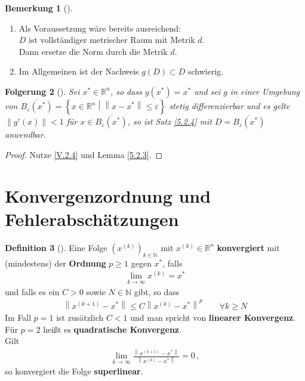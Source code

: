 \documentclass[ngerman,fontsize=11pt, paper=a4, parskip=half, titlepage=true, toc=bib]{scrbook}
\theoremstyle{definition}
\newtheorem{Def}{Definition}[section]		%
\newtheorem{Bem}[Def]{Bemerkung}	%
\theoremstyle{plain}
\newtheorem{Fol}[Def]{Folgerung}
\newcommand{\R}{\mathds{R}}
\newcommand{\N}{\mathds{N}}
\newcommand{\nn}[1]{\left\| #1 \right\|}
\newcommand{\sectione}[1]{ \setcounter{equation}{0}\section{#1}}
\newcommand{\subsectione}[1]{\addtocounter{Def}{1}\subsection{#1}}
\newenvironment{Fole}[1][]{ %
	\begin{Fol}[#1]
		}
		{
			\end{Fol}
			\addtocounter{subsection}{1}
			}
\newenvironment{Beme}[1][]{ %
	\begin{Bem}[#1]
	}
	{
	\end{Bem}
	\addtocounter{subsection}{1}
}
\newenvironment{Defe}[1][]{ %
	\begin{Def}[#1]
	}
	{
	\end{Def}
	\addtocounter{subsection}{1}
}
\begin{document}
\begin{Beme}
	\label{5.2.5}~
	\begin{enumerate}[1)]
		\item Als Voraussetzung wäre bereits ausreichend:\\
		$D$ ist vollständiger metrischer Raum mit Metrik $d$. \\
		Dann ersetze die Norm durch die Metrik $d$.
		\item Im Allgemeinen ist der Nachweis $g(D)\subset D$ schwierig.
	\end{enumerate}
\end{Beme}
  
  
  
  \begin{Fole}
  	\label{5.2.6}
  	Sei $x^{*}\in \R^n$, so dass $g(x^{*})=x^{*}$ und sei $g$ in einer Umgebung von 
  	$\overline{B_\varepsilon(x^{*})}=\left\{ x\in \R^n \middle\vert \nn{x-x^{*}}\leq \varepsilon \right\}$
  	stetig differenzierbar und es gelte $\nn{g'(x)}<1$ für $x\in \overline{B_\varepsilon(x^{*})}$,
  	so ist Satz \ref{5.2.4} mit $D=\overline{B_\varepsilon(x^{*})}$ anwendbar.
  \end{Fole}
  
  \begin{proof}
    Nutze \eqref{V.2.4} und Lemma \ref{5.2.3}.
  \end{proof}
  
  \sectione{Konvergenzordnung und Fehlerabschätzungen}
  
  \begin{Defe}
  	\label{5.3.1}
  	Eine Folge $(x^{(k)})_{k\in\N} $ mit $x^{(k)}\in\R^n$ \textbf{konvergiert} mit (mindestens)
  	der \textbf{Ordnung} $p\geq 1$ gegen $x^{*}$, falls
  	\begin{gather*}
  	\lim\limits_{k\rightarrow \infty}x^{(k)}=x^{*}
  	\end{gather*}
  	und falls es ein $C>0$ sowie $N\in\N$ gibt, so dass
  	\begin{gather*}
  	\nn{x^{(k+1)}-x^{*}} \leq C \nn{x^{(k)}-x^{*}}^p\qquad \forall k\geq N 
  	\end{gather*}
  	Im Fall $p=1$ ist zusätzlich $C<1$ und man spricht von \textbf{linearer Konvergenz}. \\
  	Für $p=2$ heißt es \textbf{quadratische Konvergenz}.
  	\\Gilt 
  	\begin{gather*} 
  	\lim\limits_{k\rightarrow \infty}\frac{\nn{x^{(k+1)}-x^{*}}}{\nn{x^{(k)}-x^{*}}} = 0\, ,
  	\end{gather*} so konvergiert die Folge \textbf{superlinear}.
  \end{Defe}
\end{document}

